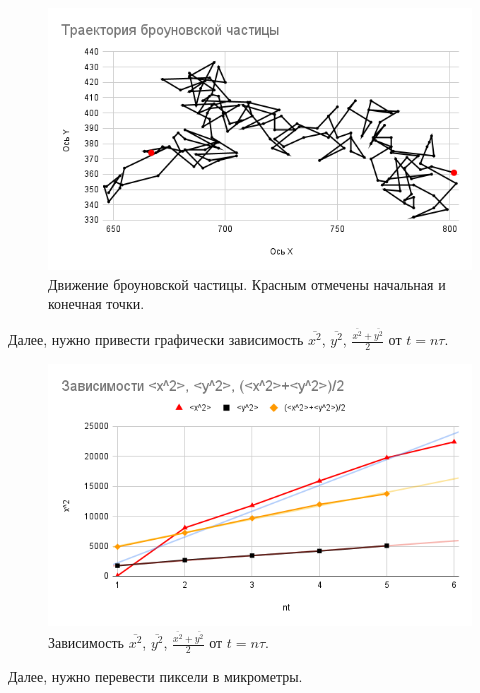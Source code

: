 \documentclass[a4paper,14pt]{article}
\begin{document}
\begin{figure}[ht!]
    \centering
    \includegraphics[scale=0.6]{trajectory.png}
    \caption{Движение броуновской частицы. Красным отмечены начальная и конечная точки.}
\end{figure}

Далее, нужно привести графически зависимость $\overline{x^2}$, $\overline{y^2}$, $\frac{\overline{x^2} + \overline{y^2}}{2}$ от $t=n\tau$.

\begin{figure}[ht!]
    \centering
    \includegraphics[scale=0.6]{graph.png}
    \caption{Зависимость $\overline{x^2}$, $\overline{y^2}$, $\frac{\overline{x^2} + \overline{y^2}}{2}$ от $t=n\tau$.}
\end{figure}

\clearpage

Далее, нужно перевести пиксели в микрометры.
\end{document}
